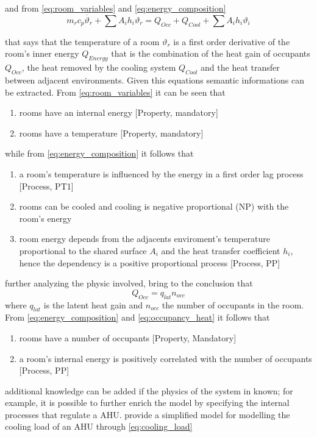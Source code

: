 and from \autoref{eq:room_variables} and \autoref{eq:energy_composition}
\begin{equation}
  m_rc_p\dot{\vartheta_{r}}+\sum{A_ih_i\vartheta_{r}}=Q_{Occ}+Q_{Cool}+\sum{A_ih_i\vartheta_{i}} \label{eq:room_lag}
\end{equation}

that says that the temperature of a room $\vartheta_r$ is a first order derivative of the room's inner energy $Q_{Energy}$ that is the combination of the heat gain of occupants $Q_{Occ}$, the heat removed by the cooling system $Q_{Cool}$ and the heat transfer between adjacent environments. Given this equations semantic informations can be extracted.
From \autoref{eq:room_variables} it can be seen that
\begin{enumerate}[noitemsep]
  \item rooms have an internal energy [Property, mandatory]
  \item rooms have a temperature [Property, mandatory]
\end{enumerate}
while from \autoref{eq:energy_composition} it follows that
\begin{enumerate}
  \item a room's temperature is influenced by the energy in a first order lag process [Process, PT1]
  \item rooms can be cooled and cooling is negative proportional (NP) with the room's energy
  \item room energy depends from the adjacents enviroment's temperature proportional to the shared surface $A_i$ and the heat transfer coefficient $h_i$, hence the dependency is a positive proportional process [Process, PP]
\end{enumerate}
further analyzing the physic involved, bring to the conclusion that
\begin{equation}
  Q_{Occ}=q_{lat}n_{occ} \label{eq:occupancy_heat}
\end{equation}
where $q_{lat}$ is the latent heat gain and $n_{occ}$ the number of occupants in the room. From  \autoref{eq:energy_composition} and \ref{eq:occupancy_heat} it follows that
\begin{enumerate}
  \item rooms have a number of occupants [Property, Mandatory]
  \item a room's internal energy is positively correlated with the number of occupants [Process, PP]
\end{enumerate}
additional knowledge can be added if the physics of the system in known; for example, it is possible to further enrich the model by specifying the internal processes that regulate a AHU. \textcite{building_ahu_physics} provide a simplified model for modelling the cooling load of an AHU through \autoref{eq:cooling_load}
